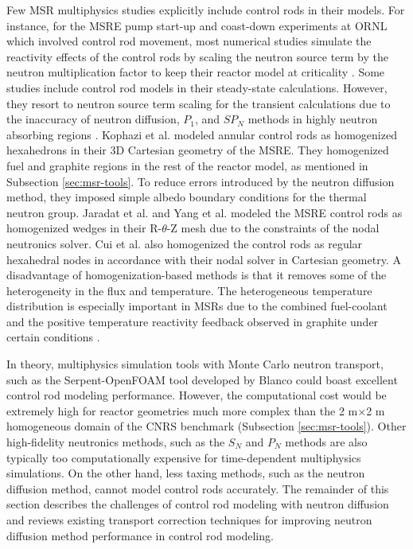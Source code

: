 Few \gls{MSR} multiphysics studies explicitly include control rods in their models. For instance,
for the \gls{MSRE} pump start-up and coast-down experiments at \gls{ORNL} which involved control
rod movement, most numerical studies simulate the reactivity effects of the control rods by scaling
the neutron source term by the neutron multiplication factor to keep their reactor model at
criticality \cite{delpech_benchmark_2003, krepel_dyn3d-msr_2007}. Some studies include control rod
models in their steady-state calculations. However, they resort to neutron source term scaling for
the transient calculations due to the inaccuracy of neutron diffusion, $P_1$, and $SP_N$ methods in
highly neutron absorbing regions \cite{kophazi_development_2009, jaradat_development_2021,
yang_development_2022}. Kophazi et al. \cite{kophazi_development_2009} modeled annular control rods
as homogenized hexahedrons in their 3D Cartesian geometry of the \gls{MSRE}. They
homogenized fuel and graphite regions in the rest of the reactor model, as mentioned in Subsection
\ref{sec:msr-tools}. To reduce errors introduced by the neutron diffusion method, they imposed
simple albedo boundary conditions for the thermal neutron group. Jaradat et al.
\cite{jaradat_development_2021} and Yang et al. \cite{yang_development_2022} modeled the \gls{MSRE}
control rods as homogenized wedges in their R-$\theta$-Z mesh due to the constraints of the nodal
neutronics solver. Cui et al. \cite{cui_development_2021} also homogenized the control rods as
regular hexahedral nodes in accordance with their nodal solver in Cartesian geometry. A disadvantage
of homogenization-based methods is that it removes some of the heterogeneity in the flux and
temperature. The heterogeneous temperature distribution is especially important in \glspl{MSR} due
to the combined fuel-coolant and the positive temperature reactivity feedback observed
in graphite under certain conditions \cite{mathieu_thorium_2006}.

In theory, multiphysics simulation tools with Monte Carlo neutron transport, such as the
Serpent-OpenFOAM tool developed by Blanco \cite{blanco_neutronic_2020} could boast excellent
control rod modeling performance. However, the computational cost would be extremely high for
reactor geometries much more complex than the 2 m$\times$2 m homogeneous domain of the CNRS
benchmark (Subsection \ref{sec:msr-tools}). Other high-fidelity neutronics methods, such as the
$S_N$ and $P_N$ methods are also typically too computationally expensive for time-dependent
multiphysics simulations. On the other hand, less taxing methods, such as the neutron diffusion
method, cannot model control rods accurately. The remainder of this section describes the
challenges of control rod modeling with neutron diffusion and reviews existing transport
correction techniques for improving neutron diffusion method performance in control rod modeling.

